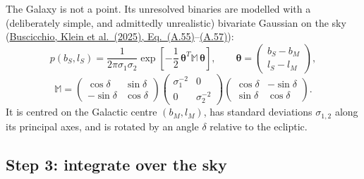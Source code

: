 \documentclass[11pt,a4paper]{article}
\newcommand{\urlPtwo}{https://arxiv.org/pdf/2410.08263}
\newcommand{\PtwoEq}[1]{\href{\urlPtwo}{Buscicchio, Klein et al.~(2025), Eq.~(#1)}}
\begin{document}
The Galaxy is not a point. Its unresolved binaries are modelled with a (deliberately
simple, and admittedly unrealistic) bivariate Gaussian on the sky
(\PtwoEq{A.55}--\href{\urlPtwo}{(A.57)}):
\begin{equation}
  p(b_S,l_S) = \frac{1}{2\pi\sigma_1\sigma_2}\exp\!\left[-\frac12\,\boldsymbol\theta^T\mathbb{M}\,\boldsymbol\theta\right],
  \qquad
  \boldsymbol\theta = \begin{pmatrix} b_S-b_M\\ l_S-l_M\end{pmatrix},
\end{equation}
\begin{equation}
  \mathbb{M} =
  \begin{pmatrix}\cos\delta & \sin\delta\\ -\sin\delta & \cos\delta\end{pmatrix}
  \begin{pmatrix}\sigma_1^{-2} & 0\\ 0 & \sigma_2^{-2}\end{pmatrix}
  \begin{pmatrix}\cos\delta & -\sin\delta\\ \sin\delta & \cos\delta\end{pmatrix}.
\end{equation}
It is centred on the Galactic centre $(b_M,l_M)$, has standard deviations
$\sigma_{1,2}$ along its principal axes, and is rotated by an angle $\delta$
relative to the ecliptic.

\subsection{Step 3: integrate over the sky}
\end{document}
